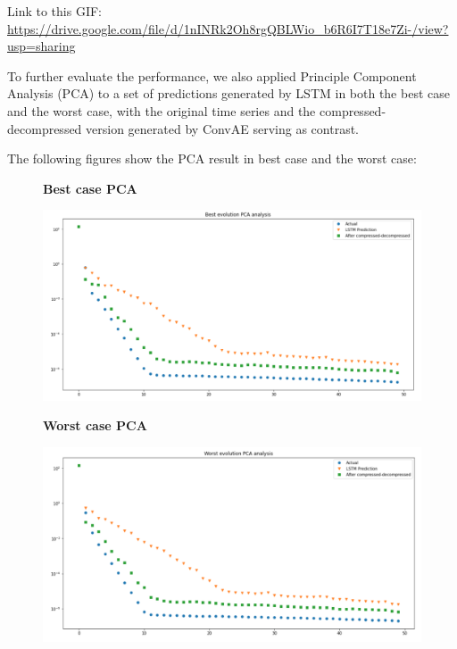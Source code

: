 Link to this GIF: 
\url{https://drive.google.com/file/d/1nINRk2Oh8rgQBLWio_b6R6I7T18e7Zi-/view?usp=sharing}

To further evaluate the performance, we also applied Principle Component Analysis (PCA) to a set of predictions generated by LSTM in both the best case and the worst case, with the original time series and the compressed-decompressed version generated by ConvAE serving as contrast.

The following figures show the PCA result in best case and the worst case:

\begin{figure}[H]
    \textbf{Best case PCA}\par\medskip
    \includegraphics[scale=0.5]{Report LaTeX/figures/mantle_convection_images/Best_case_PCA_LSTM.png}
\end{figure}

\begin{figure}[H]
    \textbf{Worst case PCA}\par\medskip
    \includegraphics[scale=0.5]{Report LaTeX/figures/mantle_convection_images/Worst_case_PCA_LSTM.png}
\end{figure}


